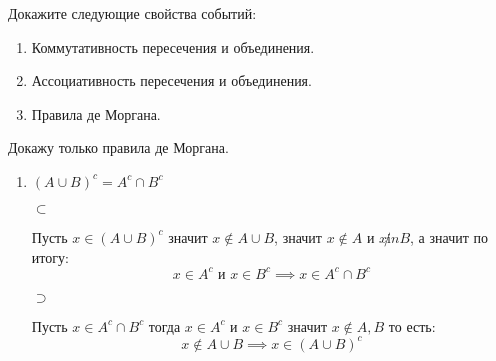 \documentclass[document]{subfiles}
\begin{document}
\begin{problem}
    Докажите следующие свойства событий:
    \begin{enumerate}
        \item Коммутативность пересечения и объединения.
        \item Ассоциативность пересечения и объединения.
        \item Правила де Моргана.
    \end{enumerate}
\end{problem}
\begin{solution}
    Докажу только правила де Моргана.
    \begin{enumerate}
        \item $(A \cup B)^c = A^c \cap B^c$

            $\subset$

            Пусть $x \in (A \cup B)^c$ значит $x \not\in A \cup B$, значит $x\not\in A$ и $x \not in B$, а значит по итогу:
            \[x \in A^c \text{ и } x \in B^c \implies x \in A^c \cap B^c\]

            $\supset$

            Пусть $x \in A^c \cap B^c$ тогда $x \in A^c$ и $x \in B^c$ значит $x \not\in A,B$ то есть:
            \[x \not\in A \cup B \implies x \in (A \cup B)^c\]
    \end{enumerate}
\end{solution}
\end{document}
